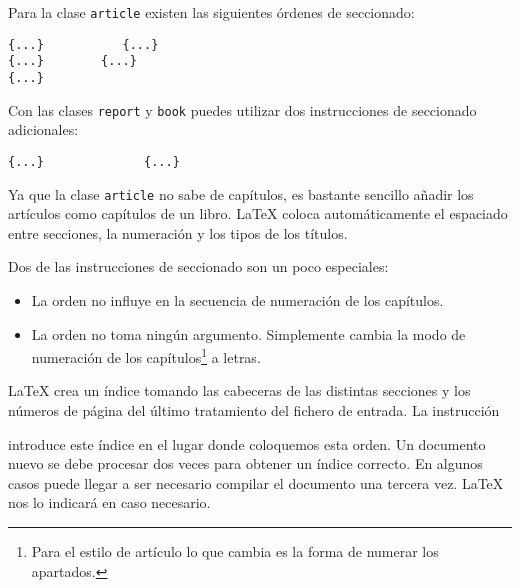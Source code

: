 Para la clase \texttt{article} existen las siguientes órdenes de
seccionado:
\nopagebreak
\begin{code}
\verb|{...}           |\verb|{...}|\\
\verb|{...}        |\verb|{...} |\\
\verb|{...}     |
\end{code}

Con  las clases  \texttt{report} y  \texttt{book} puedes  utilizar dos
instrucciones de seccionado adicionales:

\begin{code}
\verb|{...}              |\verb|{...}|
\end{code}

Ya que  la clase  \texttt{article} no sabe  de capítulos,  es bastante
sencillo añadir  los artículos  como capítulos  de un  libro. \LaTeX{}
coloca automáticamente  el espaciado entre secciones,  la numeración y
los tipos de los títulos.

Dos de las instrucciones de seccionado son un poco especiales:

\begin{itemize}

\item La orden   no influye en la secuencia  de numeración de
los capítulos.

\item  La orden   no  toma ningún  argumento. Simplemente
cambia la modo de numeración  de los capítulos\footnote{Para el estilo
de artículo  lo que cambia  es la forma  de numerar los  apartados.} a
letras.

\end{itemize}

\LaTeX{}  crea  un  índice  tomando las  cabeceras  de  las  distintas
secciones y los  números de página del último  tratamiento del fichero
de entrada. La instrucción

\begin{command}
\end{command}

\noindent  introduce este  índice en  el lugar  donde coloquemos  esta
orden. Un documento  nuevo se debe procesar dos veces  para obtener un
índice  correcto. En  algunos casos  puede
llegar a ser necesario compilar el documento una tercera vez. \LaTeX{}
nos lo indicará en caso necesario.

